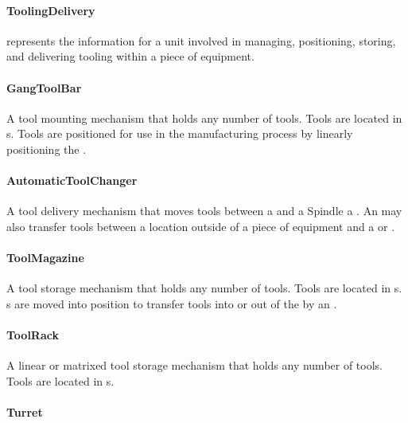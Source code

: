 \paragraph{ToolingDelivery}\mbox{}
\label{sec:ToolingDelivery}


 represents the information for a unit involved in managing, positioning, storing, and delivering tooling within a piece of equipment.



\paragraph{GangToolBar}\mbox{}
\label{sec:GangToolBar}


A tool mounting mechanism that holds any number of tools. Tools are located in s. Tools are positioned for use in the manufacturing process by linearly positioning the .


\paragraph{AutomaticToolChanger}\mbox{}
\label{sec:AutomaticToolChanger}


A tool delivery mechanism that moves tools between a  and a \gls{Spindle} a . An  may also transfer tools between a location outside of a piece of equipment and a  or .


\paragraph{ToolMagazine}\mbox{}
\label{sec:ToolMagazine}


A tool storage mechanism that holds any number of tools. Tools are located in s. s are moved into position to transfer tools into or out of the  by an .


\paragraph{ToolRack}\mbox{}
\label{sec:ToolRack}


A linear or matrixed tool storage mechanism that holds any number of tools. Tools are located in s.


\paragraph{Turret}\mbox{}
\label{sec:Turret}


